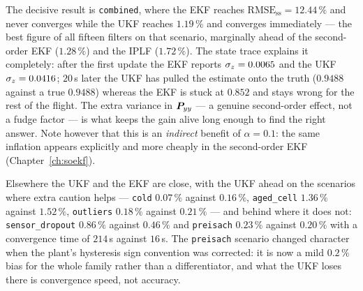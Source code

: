 The decisive result is \texttt{combined}, where the EKF reaches
$\text{RMSE}_{\text{ss}} = 12.44\,\%$ and never converges while the UKF reaches $1.19\,\%$ and
converges immediately --- the best figure of all fifteen filters on that scenario, marginally
ahead of the second-order EKF ($1.28\,\%$) and the IPLF ($1.72\,\%$). The state trace explains
it completely: after the first update the EKF reports $\sigma_z = 0.0065$ and the UKF
$\sigma_z = 0.0416$; $20$\,s later the UKF has pulled the estimate onto the truth
($0.9488$ against a true $0.9488$) whereas the EKF is stuck at $0.852$ and stays wrong for the
rest of the flight. The extra variance in $\bm{P}_{yy}$ --- a genuine second-order effect, not a
fudge factor --- is what keeps the gain alive long enough to find the right answer. Note
however that this is an \emph{indirect} benefit of $\alpha = 0.1$: the same inflation appears
explicitly and more cheaply in the second-order EKF (Chapter~\ref{ch:soekf}).

Elsewhere the UKF and the EKF are close, with the UKF ahead on the scenarios where extra
caution helps --- \texttt{cold} $0.07\,\%$ against $0.16\,\%$, \texttt{aged\_cell} $1.36\,\%$
against $1.52\,\%$, \texttt{outliers} $0.18\,\%$ against $0.21\,\%$ --- and behind where it does
not: \texttt{sensor\_dropout} $0.86\,\%$ against $0.46\,\%$ and \texttt{preisach} $0.23\,\%$
against $0.20\,\%$ with a convergence time of $214$\,s against $16$\,s. The
\texttt{preisach} scenario changed character when the plant's hysteresis sign convention was
corrected: it is now a mild $0.2\,\%$ bias for the whole family rather than a differentiator,
and what the UKF loses there is convergence speed, not accuracy.

